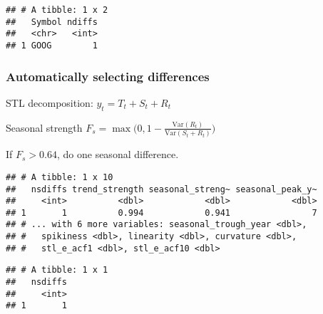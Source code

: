 \documentclass[]{book}
\newenvironment{Shaded}{\begin{snugshade}}{\end{snugshade}}
\newcommand{\DataTypeTok}[1]{\textcolor[rgb]{0.13,0.29,0.53}{#1}}
\newcommand{\KeywordTok}[1]{\textcolor[rgb]{0.13,0.29,0.53}{\textbf{#1}}}
\newcommand{\NormalTok}[1]{#1}
\newcommand{\OperatorTok}[1]{\textcolor[rgb]{0.81,0.36,0.00}{\textbf{#1}}}
\newcommand{\StringTok}[1]{\textcolor[rgb]{0.31,0.60,0.02}{#1}}
\begin{document}
\begin{verbatim}
## # A tibble: 1 x 2
##   Symbol ndiffs
##   <chr>   <int>
## 1 GOOG        1
\end{verbatim}

\hypertarget{automatically-selecting-differences}{%
\subsubsection{Automatically selecting differences}\label{automatically-selecting-differences}}

STL decomposition: \(y_t = T_t+S_t+R_t\)

Seasonal strength \(F_s = \max\big(0, 1-\frac{\text{Var}(R_t)}{\text{Var}(S_t+R_t)}\big)\)

If \(F_s > 0.64\), do one seasonal difference.

\begin{Shaded}
\end{Shaded}

\begin{verbatim}
## # A tibble: 1 x 10
##   nsdiffs trend_strength seasonal_streng~ seasonal_peak_y~
##     <int>          <dbl>            <dbl>            <dbl>
## 1       1          0.994            0.941                7
## # ... with 6 more variables: seasonal_trough_year <dbl>,
## #   spikiness <dbl>, linearity <dbl>, curvature <dbl>,
## #   stl_e_acf1 <dbl>, stl_e_acf10 <dbl>
\end{verbatim}

\begin{Shaded}
\end{Shaded}

\begin{verbatim}
## # A tibble: 1 x 1
##   nsdiffs
##     <int>
## 1       1
\end{verbatim}
\end{document}
